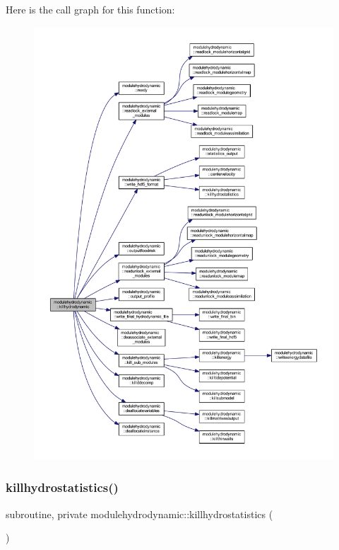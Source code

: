 Here is the call graph for this function\+:\nopagebreak
\begin{figure}[H]
\begin{center}
\leavevmode
\includegraphics[width=350pt]{namespacemodulehydrodynamic_a0f3d902c6ac5d0beab910d09d6037271_cgraph}
\end{center}
\end{figure}
\mbox{\label{namespacemodulehydrodynamic_a4ef7d15d1c97d54f708e71f1262485b0}} 
\subsubsection{\texorpdfstring{killhydrostatistics()}{killhydrostatistics()}}
{\footnotesize\ttfamily subroutine, private modulehydrodynamic\+::killhydrostatistics (\begin{DoxyParamCaption}{ }\end{DoxyParamCaption})\hspace{0.3cm}{\ttfamily [private]}}

